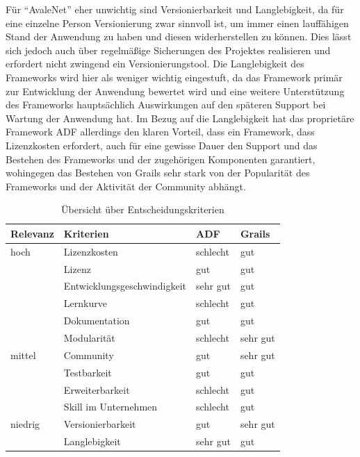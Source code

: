Für "`AvaleNet"' eher unwichtig sind Versionierbarkeit und Langlebigkeit, da für eine einzelne Person Versionierung zwar sinnvoll ist, um immer einen lauffähigen Stand der Anwendung zu haben und diesen widerherstellen zu können. Dies lässt sich jedoch auch über regelmäßige Sicherungen des Projektes realisieren und erfordert nicht zwingend ein Versionierungstool. Die Langlebigkeit des Frameworks wird hier als weniger wichtig eingestuft, da das Framework primär zur Entwicklung der Anwendung bewertet wird und eine weitere Unterstützung des Frameworks hauptsächlich Auswirkungen auf den späteren Support bei Wartung der Anwendung hat. Im Bezug auf die Langlebigkeit hat das proprietäre Framework ADF allerdings den klaren Vorteil, dass ein Framework, dass Lizenzkosten erfordert, auch für eine gewisse Dauer den Support und das Bestehen des Frameworks und der zugehörigen Komponenten garantiert, wohingegen das Bestehen von Grails sehr stark von der Popularität des Frameworks und der Aktivität der Community abhängt.
  \begin{table}[H]
  \centering
    \begin{tabular}{l l l l}
	  \toprule
	  Relevanz & Kriterien & ADF & Grails \\
	  \midrule
	  hoch & Lizenzkosten & schlecht & gut \\
	  & Lizenz & gut & gut \\
	  & Entwicklungsgeschwindigkeit & sehr gut & gut \\
	  & Lernkurve & schlecht & gut\\
	  & Dokumentation & gut & gut \\
	  & Modularität & schlecht & sehr gut \\
	  \midrule
	  mittel & Community & gut & sehr gut \\
	  & Testbarkeit & gut & gut \\
	  & Erweiterbarkeit & schlecht & gut \\
	  & Skill im Unternehmen & schlecht & gut \\
	  \midrule
	  niedrig & Versionierbarkeit &  gut & sehr gut \\
	  & Langlebigkeit &  sehr gut & gut \\
	  \bottomrule
    \end{tabular}
    \caption{Übersicht über Entscheidungskriterien}
  \end{table}